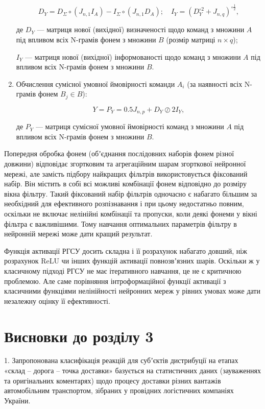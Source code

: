 \begin{enumerate}
	\[
	D_Y=D_\Sigma \circ (J_{n,1}I_A) - I_\Sigma \circ (J_{n,1}D_A);\quad I_Y=(D_Y^{\circ 2}+J_{n,q})^{\circ \frac{1}{2}},
	\]
	
	де $D_Y$ --- матриця нової (вихідної) визначеності щодо команд  з множини $A$ під впливом всіх N-грамів фонем з множини $B$ (розмір матриці $n\times q$); 
	
	$I_Y$ --- матриця нової (вихідної) інформованості щодо команд з множини $A$ під впливом всіх N-грамів фонем з множини $B$.
	
	\item Обчислення сумісної умовної ймовірності команди $A_i$ (за наявності всіх N-грамів фонем $B_j \in B$):
	
	\[
	Y=P_Y=0.5J_{n,p}+D_Y \oslash 2I_Y,
	\]
	
	де $P_Y$ --- матриця сумісної умовної ймовірності команд з множини $A$ під впливом всіх N-грамів фонем з множини $B$.
\end{enumerate}

Попередня обробка фонем (обʼєднання послідовних наборів фонем різної довжини) відповідає згортковим та агрегаційним шарам згорткової нейронної мережі, але замість підбору найкращих фільтрів використовується фіксований набір. Він містить в собі всі можливі комбінації фонем відповідно до розміру вікна фільтру. Такий фіксований набір фільтрів одночасно є набагато більшим за необхідний для ефективного розпізнавання і при цьому недостатньо повним, оскільки не включає нелінійні комбінації та пропуски, коли деякі фонеми у вікні фільтра є важливішими. Тому навчання оптимальних параметрів фільтру в нейронній мережі може дати кращий результат.

Функція активації РГСУ досить складна і її розрахунок набагато довший, ніж розрахунок ReLU чи інших функцій активації  повнозвʼязних шарів. Оскільки ж у класичному підході РГСУ не має ітеративного навчання, це не є критичною проблемою. Але саме порівняння інтроформаційної функції активації з класичними функціями нелінійності нейронних мереж у рівних умовах може дати незалежну оцінку її ефективності.

\section*{Висновки до розділу 3}

1. Запропонована класифікація реакцій для субʼєктів дистрибуції на етапах «склад – дорога – точка доставки» базується на статистичних даних (зауваженнях та оригінальних коментарях) щодо процесу доставки різних вантажів автомобільним транспортом, зібраних у провідних логістичних компаніях України.


